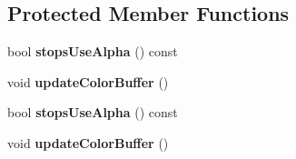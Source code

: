 \subsection*{Protected Member Functions}
\begin{DoxyCompactItemize}
\item 
bool {\bfseries stops\+Use\+Alpha} () const \hypertarget{class_q_c_p_color_gradient_a0eee10f4daef2cce01f0832d36cd1a8d}{}\label{class_q_c_p_color_gradient_a0eee10f4daef2cce01f0832d36cd1a8d}

\item 
void {\bfseries update\+Color\+Buffer} ()\hypertarget{class_q_c_p_color_gradient_a353f15ab3ab586eebf1f6b58c3e2707b}{}\label{class_q_c_p_color_gradient_a353f15ab3ab586eebf1f6b58c3e2707b}

\item 
bool {\bfseries stops\+Use\+Alpha} () const \hypertarget{class_q_c_p_color_gradient_a0eee10f4daef2cce01f0832d36cd1a8d}{}\label{class_q_c_p_color_gradient_a0eee10f4daef2cce01f0832d36cd1a8d}

\item 
void {\bfseries update\+Color\+Buffer} ()\hypertarget{class_q_c_p_color_gradient_a353f15ab3ab586eebf1f6b58c3e2707b}{}\label{class_q_c_p_color_gradient_a353f15ab3ab586eebf1f6b58c3e2707b}

\end{DoxyCompactItemize}
